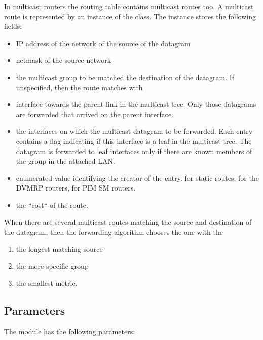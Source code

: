 In multicast routers the routing table contains multicast routes too.
A multicast route is represented by an instance of the 
class. The  instance stores the following fields:
\begin{itemize}
  \item {} IP address of the network of the source of the datagram
  \item {} netmask of the source network
  \item {} the multicast group to be matched the destination of the
  datagram. If unspecified, then the route matches with 
  \item {} interface towards the parent link in the multicast tree.
  Only those datagrams are forwarded that arrived on the parent interface.
  \item {} the interfaces on which the multicast datagram to be forwarded.
  Each entry contains a flag indicating if this interface is a leaf in the multicast
  tree. The datagram is forwarded to leaf interfaces only if there are known members
  of the group in the attached LAN.
  \item {} enumerated value identifying the creator of the entry. 
  for static routes,  for the DVMRP routers,  for PIM SM routers.
  \item {} the ``cost`` of the route. 
\end{itemize}

When there are several multicast routes matching the source and destination
of the datagram, then the forwarding algorithm chooses the one with the
\begin{enumerate}
  \item the longest matching source
  \item the more specific group
  \item the smallest metric.
\end{enumerate}

\subsection*{Parameters}

The  module has the following parameters:

